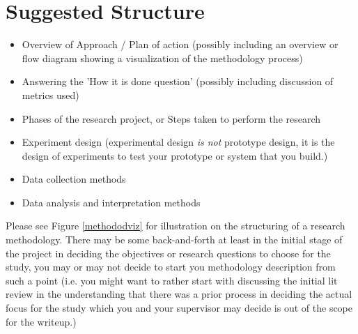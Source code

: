 \section{Suggested Structure}

\begin{itemize}
	\item Overview of Approach / Plan of action (possibly including an overview or flow diagram showing a visualization of the methodology process)
	\item Answering the 'How it is done question' (possibly including discussion of metrics used)
	\item Phases of the research project, or Steps taken to perform the research
	\item Experiment design (experimental design \textit{is not} prototype design, it is the design of experiments to test your prototype or system that you build.)
	\item Data collection methods
	\item Data analysis and interpretation methods
\end{itemize}

Please see Figure \ref{methododviz} for illustration on the structuring of a research methodology. There may be some back-and-forth at least in the initial stage of the project in deciding the objectives or research questions to choose for the study, you may or may not decide to start you methodology description from such a point (i.e. you might want to rather start with discussing the initial lit review in the understanding that there was a prior process in deciding the actual focus for the study which you and your supervisor may decide is out of the scope for the writeup.)

